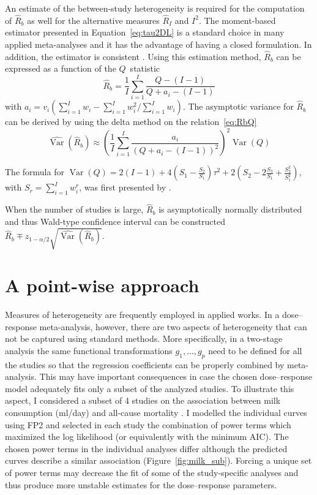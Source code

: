 \documentclass[11pt,a4paper,twoside,openany]{book}\usepackage{knitr}
\DeclareMathOperator{\Var}{Var}
\begin{document}
{{An estimate of the between-study heterogeneity is required for the computation of $\hat R_b$ as well for the alternative measures $\hat R_I$ and $I^2$. The moment-based estimator presented in Equation~\ref{eq:tau2DL} is a standard choice in many applied meta-analyses and it has the advantage of having a closed formulation. In addition, the estimator is consistent \citep{jackson2010extending}. Using this estimation method, $\hat R_b$ can be expressed as a function of the $Q$~statistic
\begin{equation}
\hat R_b = \frac{1}{I} \sum_{i = 1}^I \frac{Q - (I-1)}{Q + a_i - (I - 1)} 
\label{eq:RbQ}
\end{equation}
\noindent with $a_i = v_i \left(\sum_{i = 1}^I w_i - \sum_{i = 1}^Iw_i^2/\sum_{i = 1}^I w_i \right)$. The asymptotic variance for $\hat R_b$ can be derived by using the delta method on the relation~\ref{eq:RbQ}
\begin{equation}
\widehat{\Var} \left(\hat R_b \right) \approx \left(  \frac{1}{I} \sum_{i = 1}^I \frac{a_i}{(Q + a_i - (I-1))^2} \right)^2 \Var(Q)
\label{eq:var_Rb}
\end{equation}

\noindent The formula for $\Var(Q) = 2(I-1) + 4\left(S_1 - \frac{S_2}{S_1}\right)\tau^2 + 2\left(S_2 - 2\frac{S_3}{S_1} + \frac{S_2^2}{S_1^2} \right)$, with $S_r = \sum_{i = 1}^I w_i^r$, was first presented by \cite{ biggerstaff1997incorporating}.

\noindent When the number of studies is large, $\hat R_b$ is asymptotically normally distributed and thus Wald-type confidence interval can be constructed $\hat R_b \mp z_{1-\alpha/2} \sqrt{ \widehat{\Var} \left(\hat R_b \right)}$.



\section{A point-wise approach}\label{sec:pwa}



Measures of heterogeneity are frequently employed in applied works. In a dose--response meta-analysis, however, there are two aspects of heterogeneity that can not be captured using standard methods. More specifically, in a two-stage analysis the same functional transformations $g_1, \dots, g_p$ need to be defined for all the studies so that the regression coefficients can be properly combined by meta-analysis.
This may have important consequences in case the chosen dose--response model adequately fits only a subset of the analyzed studies. To illustrate this aspect, I considered a subset of 4 studies on the association between milk consumption (ml/day) and all-cause mortality \citep{larsson2015milk}. I modelled the individual curves using FP2 and selected in each study the combination of power terms which maximized the log likelihood (or equivalently with the minimum AIC). The chosen power terms in the individual analyses differ although the predicted curves describe a similar association (Figure~\ref{fig:milk_sub}). Forcing a unique set of power terms may decrease the fit of some of the study-specific analyses and thus produce more unstable estimates for the dose--response parameters.

}}
\end{document}
